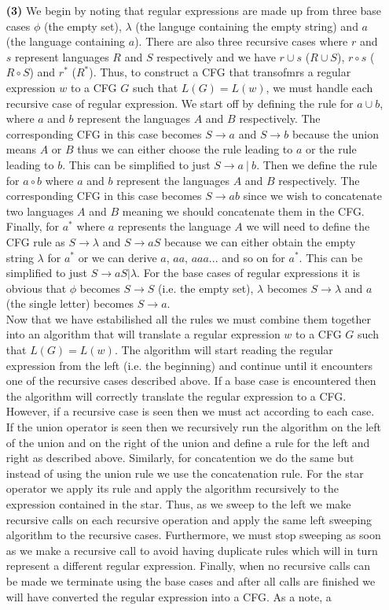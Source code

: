 \documentclass [10pt]{article}
\begin{document}
\begin{enumerate}
	\item[\textbf{(3)}]We begin by noting that regular expressions are made up from three base cases $\phi$ (the empty set), $\lambda$ (the languge containing the empty string) and $a$ (the language containing $a$). There are also three recursive cases where $r$ and $s$ represent languages $R$ and $S$ respectively and we have $r \cup s$ ($R \cup S$), $r \circ s$ ($R \circ S$) and $r^{*}$ ($R^{*}$). Thus, to construct a CFG that transofmrs a regular expression $w$ to a CFG $G$ such that $L(G) = L(w)$, we must handle each recursive case of regular expression. We start off by defining the rule for $a \cup b$, where $a$ and $b$ represent the languages $A$ and $B$ respectively. The corresponding CFG in this case becomes $S \rightarrow a$ and $S \rightarrow b$ because the union means $A$ or $B$ thus we can either choose the rule leading to $a$ or the rule leading to $b$. This can be simplified to just $S \rightarrow a\:|\:b$. Then we define the rule for $a \circ b$ where $a$ and $b$ represent the languages $A$ and $B$ respectively. The corresponding CFG in this case becomes $S \rightarrow ab$ since we wish to concatenate two languages $A$ and $B$ meaning we should concatenate them in the CFG. Finally, for $a^{*}$ where $a$ represents the language $A$ we will need to define the CFG rule as $S \rightarrow \lambda$ and $S \rightarrow aS$ because we can either obtain the empty string $\lambda$ for $a^{*}$ or we can derive $a$, $aa$, $aaa$... and so on for $a^{*}$. This can be simplified to just $S \rightarrow aS | \lambda$. For the base cases of regular expressions it is obvious that $\phi$ becomes $S \rightarrow S$ (i.e. the empty set), $\lambda$ becomes $S \rightarrow \lambda$ and $a$ (the single letter) becomes $S \rightarrow a$.\\Now that we have estabilished all the rules we must combine them together into an algorithm that will translate a regular expression $w$ to a CFG $G$ such that $L(G) = L(w)$. The algorithm will start reading the regular expression from the left (i.e. the beginning) and continue until it encounters one of the recursive cases described above. If a base case is encountered then the algorithm will correctly translate the regular expression to a CFG. However, if a recursive case is seen then we must act according to each case. If the union operator is seen then we recursively run the algorithm on the left of the union and on the right of the union and define a rule for the left and right as described above. Similarly, for concatention we do the same but instead of using the union rule we use the concatenation rule. For the star operator we apply its rule and apply the algorithm recursively to the expression contained in the star. Thus, as we sweep to the left we make recursive calls on each recursive operation and apply the same left sweeping algorithm to the recursive cases. Furthermore, we must stop sweeping as soon as we make a recursive call to avoid having duplicate rules which will in turn represent a different regular expression. Finally, when no recursive calls can be made we terminate using the base cases and after all calls are finished we will have converted the regular expression into a CFG. As a note, a 
\end{enumerate}
\end{document}

